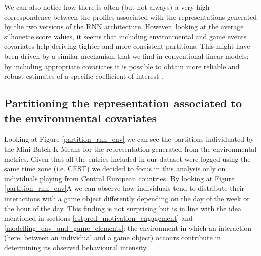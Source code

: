 We can also notice how there is often (but not always) a very high correspondence between the profiles associated with the representations generated by the two versions of the RNN architecture. However, looking at the average silhouette score values, it seems that including environmental and game events covariates help deriving tighter and more consistent partitions. This might have been driven by a similar mechanism that we find in conventional linear models: by including appropriate covariates it is possible to obtain more reliable and robust estimates of a specific coefficient of interest \cite{gelman2020regression}.

\subsection{Partitioning the representation associated to the environmental covariates}
\label{partition_environment}
Looking at Figure \ref{partition_rnn_env} we can see the partitions individuated by the Mini-Batch K-Means for the representation generated from the environmental metrics. Given that all the entries included in our dataset were logged using the same time zone (i.e. CEST) we decided to focus in this analysis only on individuals playing from Central European countries. By looking at Figure \ref{partition_rnn_env}A we can observe how individuals tend to distribute their interactions with a game object differently depending on the day of the week or the hour of the day. This finding is not surprising but is in line with the idea mentioned in sections \ref{estpred_motivation_engagement} and \ref{modelling_env_and_game_elements}: the environment in which an interaction (here, between an individual and a game object) occours contribute in determining its observed behavioural intensity. 

